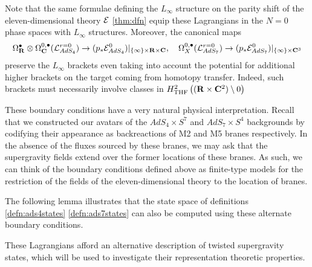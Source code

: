 \documentclass[../main.tex]{subfiles}
\begin{document}
Note that the same formulae defining the $L_\infty$ structure on the parity shift of the eleven-dimensional theory $\mathcal{E}$ \ref{thm:dfn} equip these Lagrangians in the $N=0$ phase spaces with $L_\infty$ structures. Moreover, the canonical maps
\[
\Omega^\bullet_{\mathbf{R}} \otimes \Omega^{0,\bullet}_{\mathbf{C}} (\mathcal{L}^{r=0}_{AdS_4} ) \to (p_* \mathcal{E}^0 _{AdS_4})|_{\{\infty\} \times \mathbf{R}\times \mathbf{C}}, \quad \Omega^{0,\bullet}_{X} (\mathcal{L}^{r=0}_{AdS_7} ) \to (p_* \mathcal{E}^0 _{AdS_7})|_{\{\infty\} \times \mathbf{C}^3}
\]
preserve the $L_\infty$ brackets even taking into account the potential for additional higher brackets on the target coming from homotopy transfer. Indeed, such brackets must necessarily involve classes in $H^2_{\mathrm{THF}} \left ( (\mathbf{R}\times \mathbf{C}^2)\setminus 0 \right )$

\begin{rmk}
These boundary conditions have a very natural physical interpretation. Recall that we constructed our avatars of the $AdS_4\times S^7$ and $AdS_7\times S^4$ backgrounds by codifying their appearance as backreactions of M2 and M5 branes respectively. In the absence of the fluxes sourced by these branes, we may ask that the supergravity fields extend over the former locations of these branes. As such, we can think of the boundary conditions defined above as finite-type models for the restriction of the fields of the eleven-dimensional theory to the location of branes. 
\end{rmk}

\parsec[]

The following lemma illustrates that the state space of definitions \ref{defn:ads4states} \ref{defn:ads7states} can also be computed using these alternate boundary conditions.

These Lagrangians afford an alternative description of twisted supergravity states, which will be used to investigate their representation theoretic properties.
\end{document}
